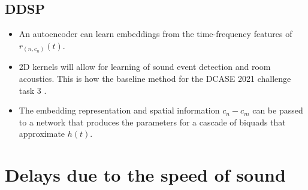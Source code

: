 \documentclass[14pt]{extarticle}
\begin{document}
\subsection{DDSP}

\begin{itemize}

\item An autoencoder can learn embeddings from the time-frequency features of $r_{(n,c_n)}(t)$. 

\item 2D kernels will allow for learning of sound event detection and room acoustics. This is how the baseline method for the DCASE 2021 challenge task 3 \cite{Shimada2021}.

\item The embedding representation and spatial information $c_n  - c_m$ can be passed to a network that produces the parameters for a cascade of biquads that approximate $h(t)$.

\end{itemize}

\section{Delays due to the speed of sound}
\end{document}
